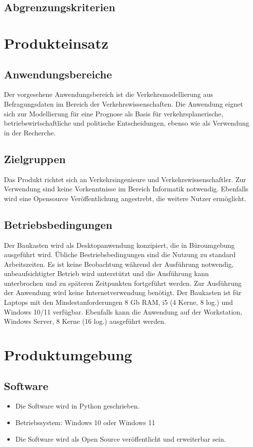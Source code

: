 \documentclass{article}
\begin{document}
\subsection{Abgrenzungskriterien}

\newpage
\section{Produkteinsatz}
\subsection{Anwendungsbereiche}
Der vorgesehene Anwendungsbereich ist die Verkehrsmodellierung aus Befragungsdaten im Bereich der Verkehrswissenschaften. Die Anwendung eignet sich zur Modellierung für eine Prognose als Basis für verkehrsplanerische, betriebswirtschaftliche und politische Entscheidungen, ebenso wie als Verwendung in der Recherche.

\subsection{Zielgruppen}
Das Produkt richtet sich an Verkehrsingenieure und Verkehrswissenschaftler. Zur Verwendung sind keine Vorkenntnisse im Bereich Informatik notwendig. Ebenfalls wird eine Opensource Veröffentlichung angestrebt, die weitere Nutzer ermöglicht.
  
\subsection{Betriebsbedingungen}
Der Baukasten wird als Desktopanwendung konzipiert, die in Büroumgebung ausgeführt wird. Übliche Bestriebsbedingungen sind die Nutzung zu standard Arbeitszeiten. Es ist keine Beobachtung während der Ausführung notwendig, unbeaufsichtigter Betrieb wird unterstützt und die Ausführung kann unterbrochen und zu späteren Zeitpunkten fortgeführt werden. Zur Ausführung der Anwendung wird keine Internetverwendung benötigt.
Der Baukasten ist für Laptops mit den Mindestanforderungen 8 Gb RAM, i5 (4 Kerne, 8 log.) und Windows 10/11 verfügbar. Ebenfalls kann die Anwendung auf der Workstation, Windows Server, 8 Kerne (16 log.) ausgeführt werden.
\newpage

\section{Produktumgebung}
\subsection{Software}
\begin{itemize}
    \item Die Software wird in Python geschrieben.
    \item Betriebssystem: Windows 10 oder Windows 11
    \item Die Software wird als Open Source veröffentlicht und erweiterbar sein.
\end{itemize}
\end{document}
